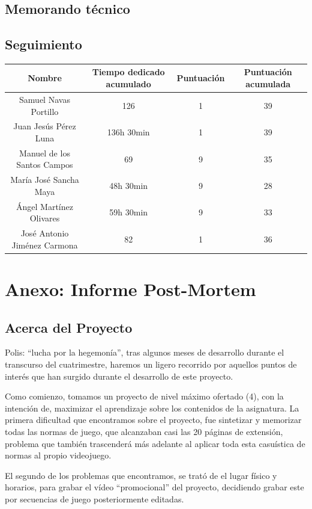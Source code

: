 \documentclass[11 pt]{book}
\begin{document}
	\section{Memorando técnico}
		
		
	\section{Seguimiento}
		\begin{tabular}{|c|c|c|c|}
			\hline
			Nombre & Tiempo dedicado acumulado & Puntuación & Puntuación acumulada\\
			\hline
			Samuel Navas Portillo & 126 & 1 & 39\\
			Juan Jesús Pérez Luna & 136h 30min & 1 & 39\\
			Manuel de los Santos Campos & 69 & 9 & 35\\
			María José Sancha Maya & 48h 30min & 9 & 28\\
			Ángel Martínez Olivares & 59h 30min & 9 & 33\\
			José Antonio Jiménez Carmona & 82 & 1 & 36\\
			\hline
		\end{tabular}
		
\chapter{Anexo: Informe Post-Mortem}
	\section*{Acerca del Proyecto}
		Polis: “lucha por la hegemonía”, tras algunos meses de desarrollo durante el transcurso del cuatrimestre, haremos un ligero recorrido por aquellos puntos de interés que han surgido durante el desarrollo de este proyecto. 

		Como comienzo, tomamos un proyecto de nivel máximo ofertado (4), con la intención de, maximizar el aprendizaje sobre los contenidos de la asignatura. La primera dificultad que encontramos sobre el proyecto, fue sintetizar y memorizar todas las normas de juego, que alcanzaban casi las 20 páginas de extensión, problema que también trascenderá más adelante al aplicar toda esta casuística de normas al propio videojuego.

		El segundo de los problemas que encontramos, se trató de el lugar físico y horarios, para grabar el vídeo “promocional” del proyecto, decidiendo grabar este por secuencias de juego posteriormente editadas.
\end{document}
